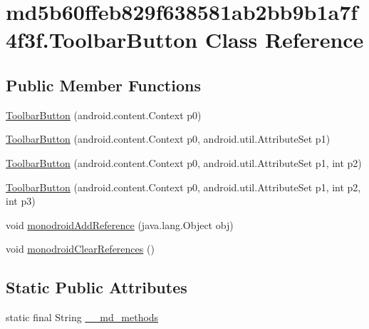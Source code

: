 \hypertarget{classmd5b60ffeb829f638581ab2bb9b1a7f4f3f_1_1_toolbar_button}{
\section{md5b60ffeb829f638581ab2bb9b1a7f4f3f.ToolbarButton Class Reference}
\label{classmd5b60ffeb829f638581ab2bb9b1a7f4f3f_1_1_toolbar_button}
}
\subsection*{Public Member Functions}
\begin{CompactItemize}
\item 
\hyperlink{classmd5b60ffeb829f638581ab2bb9b1a7f4f3f_1_1_toolbar_button_3c5b1d6dde9df6e1f5c4364406222cd1}{ToolbarButton} (android.content.Context p0)
\item 
\hyperlink{classmd5b60ffeb829f638581ab2bb9b1a7f4f3f_1_1_toolbar_button_ba93a3ac87dc10f5713a4882c68fee02}{ToolbarButton} (android.content.Context p0, android.util.AttributeSet p1)
\item 
\hyperlink{classmd5b60ffeb829f638581ab2bb9b1a7f4f3f_1_1_toolbar_button_d5e43fe6b0e4f51252d4391663d59e82}{ToolbarButton} (android.content.Context p0, android.util.AttributeSet p1, int p2)
\item 
\hyperlink{classmd5b60ffeb829f638581ab2bb9b1a7f4f3f_1_1_toolbar_button_aae2da423d7cf4bca5554637f07037c8}{ToolbarButton} (android.content.Context p0, android.util.AttributeSet p1, int p2, int p3)
\item 
void \hyperlink{classmd5b60ffeb829f638581ab2bb9b1a7f4f3f_1_1_toolbar_button_f05d5521378aa2cb4172b52389931500}{monodroidAddReference} (java.lang.Object obj)
\item 
void \hyperlink{classmd5b60ffeb829f638581ab2bb9b1a7f4f3f_1_1_toolbar_button_c9d5767f28660a403f0a190266bd2b40}{monodroidClearReferences} ()
\end{CompactItemize}
\subsection*{Static Public Attributes}
\begin{CompactItemize}
\item 
static final String \hyperlink{classmd5b60ffeb829f638581ab2bb9b1a7f4f3f_1_1_toolbar_button_4b908a9906061cf63121c61f707eb1da}{\_\-\_\-md\_\-methods}
\end{CompactItemize}
